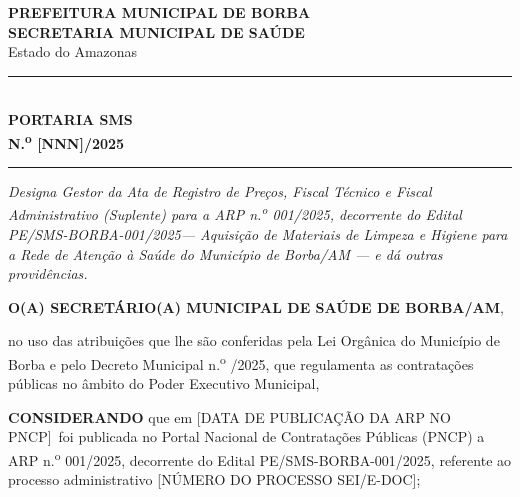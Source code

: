 \documentclass[12pt,a4paper]{article}
\newcommand{\blank}[1]{\underline{\hspace{#1}}}
\newcounter{consid}
\newcommand{\considerando}[1]{%
  \stepcounter{consid}%
  \noindent\textbf{CONSIDERANDO} #1;\\[4pt]}
\newcommand{\portNum}{[NNN]}          %
\newcommand{\exercicio}{2025}
\newcommand{\arpRef}{ARP n.\textsuperscript{o} 001/2025}
\newcommand{\editalRef}{Edital PE/SMS-BORBA-001/2025}
\newcommand{\procNum}{[NÚMERO DO PROCESSO SEI/E-DOC]}
\newcommand{\pubData}{[DATA DE PUBLICAÇÃO DA ARP NO PNCP]}
\begin{document}
\setlength{\parindent}{0pt}

\begin{center}
  {\large\bfseries\color{navy}PREFEITURA MUNICIPAL DE BORBA}\\[2pt]
  {\normalsize\bfseries\color{navy}SECRETARIA MUNICIPAL DE SAÚDE}\\[2pt]
  {\small\color{medblue}Estado do Amazonas}\\[0.6cm]
  \textcolor{navy!30}{\rule{0.85\linewidth}{1.2pt}}\\[0.5cm]

  {\LARGE\bfseries\color{navy}PORTARIA SMS}\\[3pt]
  {\Large\bfseries N.\textsuperscript{o} \portNum/\exercicio}\\[0.5cm]
  \textcolor{navy!30}{\rule{0.85\linewidth}{0.6pt}}
\end{center}

\vspace{0.4cm}
\begin{center}
\begin{minipage}{0.92\linewidth}
\small\centering\itshape
Designa Gestor da Ata de Registro de Preços, Fiscal Técnico e Fiscal
Administrativo (Suplente) para a \arpRef, decorrente do \editalRef ---
Aquisição de Materiais de Limpeza e Higiene para a Rede de Atenção à
Saúde do Município de Borba/AM --- e dá outras providências.
\end{minipage}
\end{center}

\vspace{0.6cm}
\begin{center}
  \textbf{O(A) SECRETÁRIO(A) MUNICIPAL DE SAÚDE DE BORBA/AM},
\end{center}

\noindent no uso das atribuições que lhe são conferidas pela Lei Orgânica do
Município de Borba e pelo Decreto Municipal n.\textsuperscript{o}
\blank{0.8cm}/\exercicio, que regulamenta as contratações públicas no âmbito
do Poder Executivo Municipal,

\vspace{0.4cm}

\considerando{que em \pubData\ foi publicada no Portal Nacional de Contratações
Públicas (PNCP) a \arpRef, decorrente do \editalRef, referente ao processo
administrativo \procNum}
\end{document}
